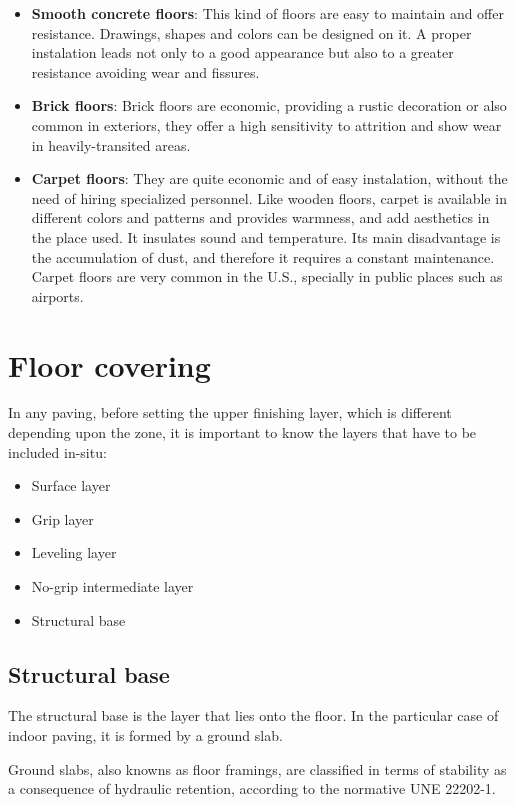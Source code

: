 \begin{itemize}
	\item \textbf{Smooth concrete floors}:
	This kind of floors are easy to maintain and offer resistance. Drawings, shapes and colors can be designed on it. A proper instalation leads not only to a good appearance but also to a greater resistance avoiding wear and fissures.
	
	\item \textbf{Brick floors}:
	Brick floors are economic, providing a rustic decoration or also common in exteriors, they offer a high sensitivity to attrition and show wear in heavily-transited areas.
	
	\item \textbf{Carpet floors}:
	They are quite economic and of easy instalation, without the need of hiring specialized personnel. Like wooden floors, carpet is available in different colors and patterns and provides warmness, and add aesthetics in the place used. It insulates sound and temperature. Its main disadvantage is the accumulation of dust, and therefore it requires a constant maintenance. Carpet floors are very common in the U.S., specially in public places such as airports.
	\end{itemize}
	
	\section{Floor covering}
	
	In any paving, before setting the upper finishing layer, which is different depending upon the zone, it is important to know the layers that have to be included in-situ:
	\begin{itemize}
	\item Surface layer 
	\item Grip layer 
	\item Leveling layer 
	\item No-grip intermediate layer 
	\item Structural base 
	\end{itemize}
		\subsection{Structural base}
	The structural base is the layer that lies onto the floor. In the particular case of indoor paving, it is formed by a ground slab.
	
	Ground slabs, also knowns as floor framings, are classified in terms of stability as a consequence of hydraulic retention, according to the normative UNE 22202-1.
	

